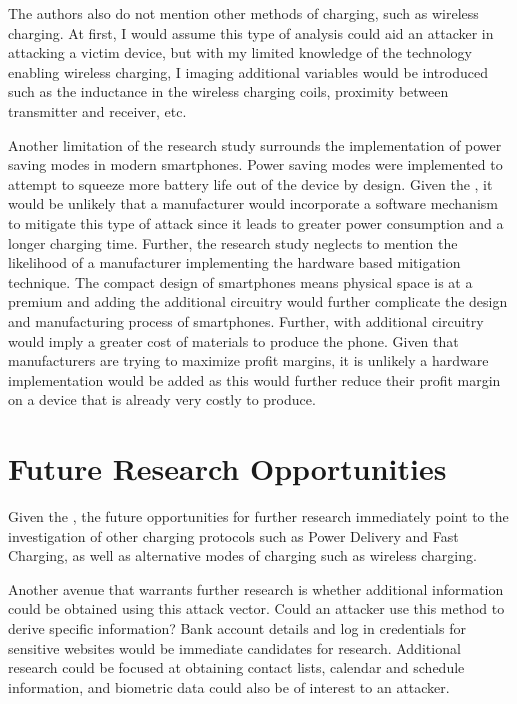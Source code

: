 The authors also do not mention other methods of charging, such as wireless charging. At first, I would assume this type of analysis could aid an attacker in attacking a victim device, but with my limited knowledge of the technology enabling wireless charging, I imaging additional variables would be introduced such as the inductance in the wireless charging coils, proximity between transmitter and receiver, etc. 

Another limitation of the research study surrounds the implementation of power saving modes in modern smartphones. Power saving modes were implemented to attempt to squeeze more battery life out of the device by design. Given the , it would be unlikely that a manufacturer would incorporate a software mechanism to mitigate this type of attack since it leads to greater power consumption and a longer charging time. Further, the research study neglects to mention the likelihood of a manufacturer implementing the hardware based mitigation technique. The compact design of smartphones means physical space is at a premium and adding the additional circuitry would further complicate the design and manufacturing process of smartphones. Further, with additional circuitry would imply a greater cost of materials to produce the phone. Given that manufacturers are trying to maximize profit margins, it is unlikely a hardware implementation would be added as this would further reduce their profit margin on a device that is already very costly to produce.

\section{Future Research Opportunities}
Given the , the future opportunities for further research immediately point to the investigation of other charging protocols such as Power Delivery and Fast Charging, as well as alternative modes of charging such as wireless charging. 

Another avenue that warrants further research is whether additional information could be obtained using this attack vector. Could an attacker use this method to derive specific information? Bank account details and log in credentials for sensitive websites would be immediate candidates for research. Additional research could be focused at obtaining contact lists, calendar and schedule information, and biometric data could also be of interest to an attacker. 